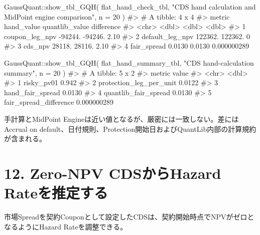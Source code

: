 \documentclass[
  letterpaper,
  DIV=11,
  numbers=noendperiod]{scrreprt}
\newenvironment{Shaded}{\begin{snugshade}}{\end{snugshade}}
\newcommand{\AttributeTok}[1]{\textcolor[rgb]{0.40,0.45,0.13}{#1}}
\newcommand{\CommentTok}[1]{\textcolor[rgb]{0.37,0.37,0.37}{#1}}
\newcommand{\DecValTok}[1]{\textcolor[rgb]{0.68,0.00,0.00}{#1}}
\newcommand{\FunctionTok}[1]{\textcolor[rgb]{0.28,0.35,0.67}{#1}}
\newcommand{\NormalTok}[1]{\textcolor[rgb]{0.00,0.23,0.31}{#1}}
\newcommand{\SpecialCharTok}[1]{\textcolor[rgb]{0.37,0.37,0.37}{#1}}
\newcommand{\StringTok}[1]{\textcolor[rgb]{0.13,0.47,0.30}{#1}}
\begin{document}
\begin{Shaded}
\begin{Highlighting}[]
\NormalTok{GaussQuant}\SpecialCharTok{::}\FunctionTok{show\_tbl\_GQH}\NormalTok{(}
\NormalTok{  flat\_hand\_check\_tbl,}
  \StringTok{"CDS hand calculation and MidPoint engine comparison"}\NormalTok{,}
  \AttributeTok{n =} \DecValTok{20}
\NormalTok{)}
\CommentTok{\#\textgreater{} \# A tibble: 4 x 4}
\CommentTok{\#\textgreater{}   metric           hand\_value quantlib\_value  difference}
\CommentTok{\#\textgreater{}   \textless{}chr\textgreater{}                 \textless{}dbl\textgreater{}          \textless{}dbl\textgreater{}       \textless{}dbl\textgreater{}}
\CommentTok{\#\textgreater{} 1 coupon\_leg\_npv  {-}94244.        {-}94246.     2.10       }
\CommentTok{\#\textgreater{} 2 default\_leg\_npv 122362.        122362.     0          }
\CommentTok{\#\textgreater{} 3 cds\_npv          28118.         28116.     2.10       }
\CommentTok{\#\textgreater{} 4 fair\_spread          0.0130         0.0130 0.000000289}

\NormalTok{GaussQuant}\SpecialCharTok{::}\FunctionTok{show\_tbl\_GQH}\NormalTok{(}
\NormalTok{  flat\_hand\_summary\_tbl,}
  \StringTok{"CDS hand{-}calculation summary"}\NormalTok{,}
  \AttributeTok{n =} \DecValTok{20}
\NormalTok{)}
\CommentTok{\#\textgreater{} \# A tibble: 5 x 2}
\CommentTok{\#\textgreater{}   metric                        value}
\CommentTok{\#\textgreater{}   \textless{}chr\textgreater{}                         \textless{}dbl\textgreater{}}
\CommentTok{\#\textgreater{} 1 risky\_pv01              0.942      }
\CommentTok{\#\textgreater{} 2 protection\_leg\_per\_unit 0.0122     }
\CommentTok{\#\textgreater{} 3 hand\_fair\_spread        0.0130     }
\CommentTok{\#\textgreater{} 4 quantlib\_fair\_spread    0.0130     }
\CommentTok{\#\textgreater{} 5 fair\_spread\_difference  0.000000289}
\end{Highlighting}
\end{Shaded}

手計算とMidPoint
Engineは近い値となるが、厳密には一致しない。差にはAccrual on
default、日付規則、Protection開始日およびQuantLib内部の計算規約が含まれる。

\section{12. Zero-NPV CDSからHazard
Rateを推定する}\label{zero-npv-cdsux304bux3089hazard-rateux3092ux63a8ux5b9aux3059ux308b}

市場Spreadを契約Couponとして設定したCDSは、契約開始時点でNPVがゼロとなるようにHazard
Rateを調整できる。
\end{document}
